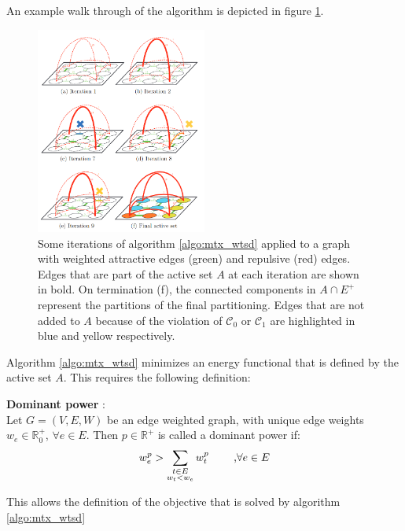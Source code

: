 An example walk through of the algorithm is depicted in figure \ref{fig_mtxwtsd1}. \\

\begin{figure}
	\centering
	\includegraphics[width=0.5\textwidth]{figures/mutexwatershed/walkthrough}
	\caption{\cite{wolf2019mutex} Some iterations of algorithm \ref{algo:mtx_wtsd} applied to a graph with weighted attractive edges (green) and repulsive (red) edges. Edges that are part of the active set $A$ at each iteration are shown in bold. On termination (f), the connected components in $A \cap E^+$ represent the partitions of the final partitioning. Edges that are not added to $A$ because of the violation of $\mathcal{C}_0$ or $\mathcal{C}_1$ are highlighted in blue and yellow respectively.}
	\label{fig_mtxwtsd1}
\end{figure}

\newpage
Algorithm \ref{algo:mtx_wtsd} minimizes an energy functional that is defined by the active set $A$. This requires the following definition:
\begin{defn}
	\textbf{Dominant power} \cite{wolf2019mutex}: \\
	Let $G = (V, E, W)$ be an edge weighted graph, with unique edge weights $w_e \in \mathbb{R}_0^+$, $\forall e \in E$. Then $p \in \mathbb{R}^+$ is called a dominant power if:\\
	\begin{align}
		w_e^p > \sum_{\substack{t \in E \\ w_t < w_e}} w_t^p \text{\hspace{8mm},} \forall e \in E
	\end{align}
\end{defn}
 This allows the definition of the objective that is solved by algorithm \ref{algo:mtx_wtsd}
 

